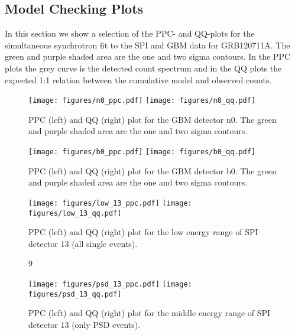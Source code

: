 \documentclass[twocolumn]{aa}
\begin{document}
\begin{appendix}
  \section{Model Checking Plots}
  \label{appendix}
  In this section we show a selection of the PPC- and QQ-plots for the simultaneous synchrotron fit to the SPI and GBM data for GRB120711A. The green and purple shaded area are the one and two sigma contours. In the PPC plots the grey curve is the detected count spectrum and in the QQ plots the expected 1:1 relation between the cumulative model and observed counts.
  \begin{figure*}[h]
    \begin{centering}
      \texttt{[image: figures/n0\_ppc.pdf]}
      \texttt{[image: figures/n0\_qq.pdf]}
      \caption{PPC (left) and QQ (right) plot for the GBM detector n0. The green and purple shaded area are the one and two sigma contours.}
      \label{fig:n0_model_check}
    \end{centering}
  \end{figure*}
  \begin{figure*}[h]
    \begin{centering}
      \texttt{[image: figures/b0\_ppc.pdf]}
      \texttt{[image: figures/b0\_qq.pdf]}
      \caption{PPC (left) and QQ (right) plot for the GBM detector b0. The green and purple shaded area are the one and two sigma contours.}
      \label{fig:b0_model_check}
    \end{centering}
  \end{figure*}
  \begin{figure*}[h]
    \begin{centering}
      \texttt{[image: figures/low\_13\_ppc.pdf]}
      \texttt{[image: figures/low\_13\_qq.pdf]}
      \caption{PPC (left) and QQ (right) plot for the low energy range of SPI detector 13 (all single events).}
      \label{fig:low_13_model_check}
    \end{centering}
  \end{figure*}
  \begin{figure*}[h]9
    \begin{centering}
      \texttt{[image: figures/psd\_13\_ppc.pdf]}
      \texttt{[image: figures/psd\_13\_qq.pdf]}
      \caption{PPC (left) and QQ (right) plot for the middle energy range of SPI detector 13 (only PSD events).}
      \label{fig:psd_13_model_check}
    \end{centering}
  \end{figure*}
\end{appendix}



\end{document}
